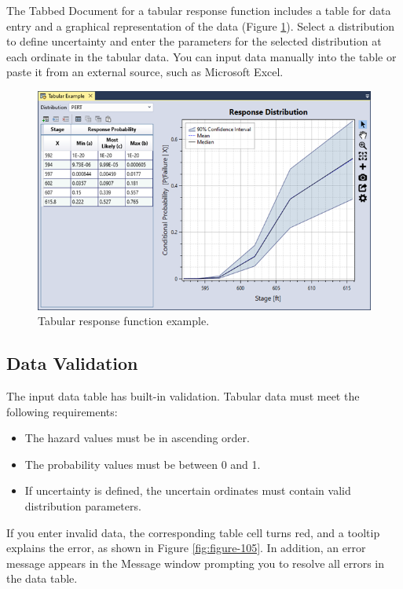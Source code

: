 \documentclass[
]{book}
\begin{document}
The Tabbed Document for a tabular response function includes a table for data entry and a graphical representation of the data (Figure \ref{fig:figure-104}). Select a distribution to define uncertainty and enter the parameters for the selected distribution at each ordinate in the tabular data. You can input data manually into the table or paste it from an external source, such as Microsoft Excel.

\begin{figure}

{\centering \includegraphics{images/figure104} 

}

\caption{Tabular response function example.}\label{fig:figure-104}
\end{figure}

\hypertarget{data-validation-2}{%
\subsection{Data Validation}\label{data-validation-2}}

The input data table has built-in validation. Tabular data must meet the following requirements:

\begin{itemize}
\item
  The hazard values must be in ascending order.
\item
  The probability values must be between 0 and 1.
\item
  If uncertainty is defined, the uncertain ordinates must contain valid distribution parameters.
\end{itemize}

If you enter invalid data, the corresponding table cell turns red, and a tooltip explains the error, as shown in Figure \ref{fig:figure-105}. In addition, an error message appears in the Message window prompting you to resolve all errors in the data table.
\end{document}
